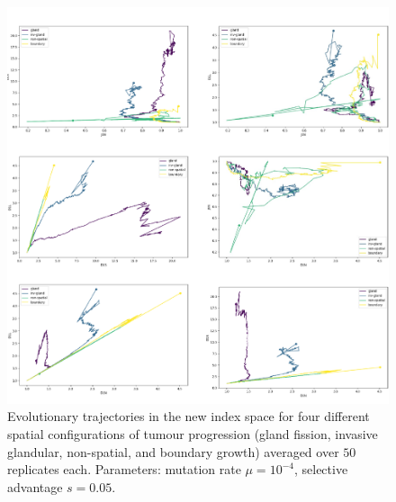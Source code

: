 \begin{figure}[h!]
    \centering
    \includegraphics[width=\textwidth]{Chapter_3/figures/1e04005new.pdf}
    \caption{Evolutionary trajectories in the new index space for four
    different spatial configurations of tumour progression (gland fission,
    invasive glandular, non-spatial, and boundary growth) averaged over $50$
    replicates each. Parameters: mutation rate $\mu = 10^{-4}$, selective
    advantage $s = 0.05$.}
    \label{fig:1e04_005new}
\end{figure}
\clearpage

